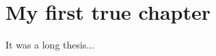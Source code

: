 \ifdefined{}
\else
\setcounter{chapter}{2} %
\dominitoc
\faketableofcontents
\fi

\chapter{My first true chapter}
\label{chap:my_chapter}
\minitoc
\label{chap:2}

It was a long thesis...
